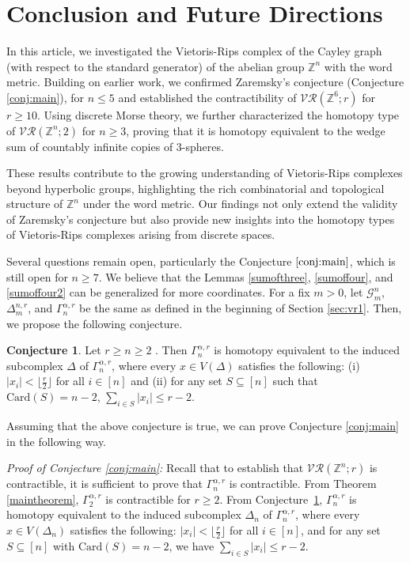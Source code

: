 \documentclass{amsart}
\theoremstyle{definition}
\newtheorem{conj}[theorem]{Conjecture}
\theoremstyle{remark}
\numberwithin{equation}{section}
\newcommand{\f}{\lfloor\frac{r}{2}\rfloor}
\newcommand{\G}{\mathcal{G}}
\newcommand{\vr}[2]{\mathcal{VR}(#1;#2)}
\def\Z{{\mathbb{Z}}}
\begin{document}
\section{Conclusion and Future Directions}\label{Conclusion}

In this article, we investigated the Vietoris-Rips complex of the Cayley graph (with respect to the standard generator) of the abelian group $\Z^n$ with the word metric. Building on earlier work, we confirmed Zaremsky’s conjecture (Conjecture \ref{conj:main}), for $n \leq 5$ and established the contractibility of $\vr{\Z^6}{r}$ for $r \geq 10$. Using discrete Morse theory, we further characterized the homotopy type of $\vr{\Z^n}{2}$ for $n \geq 3$, proving that it is homotopy equivalent to the wedge sum of countably infinite copies of  $3$-spheres.  

These results contribute to the growing understanding of Vietoris-Rips complexes beyond hyperbolic groups, highlighting the rich combinatorial and topological structure of $\Z^n$ under the word metric. Our findings not only extend the validity of Zaremsky’s conjecture but also provide new insights into the homotopy types of Vietoris-Rips complexes arising  from discrete spaces.  

Several questions remain open, particularly the Conjecture $\ref{conj:main}$, which is still open for $n\geq 7$. We believe that the Lemmas \ref{sumofthree},  \ref{sumoffour}, and \ref{sumoffour2} can be generalized for more coordinates. For a fix $m > 0$, let $\G_m^n$, $\Delta_m^{n, r}$, and  $\Gamma_{n}^{\alpha,r}$ be the same as defined in  the beginning of Section \ref{sec:vr1}. Then, we propose the following conjecture.



\begin{conj}\label{conj:future}
	Let $r\geq n\geq 2$ . Then $\Gamma_n^{\alpha, r}$ is homotopy equivalent to the induced subcomplex $\Delta$ of $\Gamma_n^{\alpha, r}$, where every $x \in V(\Delta)$ satisfies the following: (i) $|x_i|< \f $ for all $i \in [n]$ and (ii) for any set $S\subseteq [n]$ such that $\text{Card}(S)=n-2$, $\sum_{i\in S}|x_i|\leq r-2$.
\end{conj}

Assuming that the above conjecture is true, we can prove Conjecture \ref{conj:main} in the following way.

\noindent\textit{Proof of Conjecture \ref{conj:main}:} Recall that to establish that $\vr{\mathbb{Z}^n}{r}$ is contractible, it is sufficient to prove that $\Gamma_{n}^{\alpha,r}$ is contractible. 
From Theorem \ref{maintheorem}, $\Gamma_2^{\alpha, r}$ is contractible for $r \geq 2$. From Conjecture~\ref{conj:future}, $\Gamma_n^{\alpha, r}$ is homotopy equivalent to the induced subcomplex $\Delta_n$ of $\Gamma_n^{\alpha, r}$, where every $x \in V(\Delta_n)$ satisfies the following: $|x_i| < \f$ for all $i \in [n]$, and for any set $S \subseteq [n]$ with $\text{Card}(S) = n-2$, we have $\sum_{i \in S} |x_i| \leq r-2$.
\end{document}
